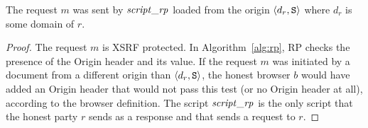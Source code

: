   
  \begin{lemma}\label{lemma:request-m-is-from-script-rp}
    The request $m$ was sent by $\mathit{script\_rp}$ loaded from 
    the origin $\langle d_r, \mathtt{S}\rangle$ where $d_r$ is some domain of 
    $r$.
  \end{lemma}
  
  \begin{proof}
    The request $m$ is XSRF protected. In Algorithm~\ref{alg:rp}, 
    RP checks the presence of the Origin header and its value. 
    If the request $m$ was initiated by a document from a 
    different origin than $\langle d_r, \mathtt{S}\rangle$, the honest browser 
    $b$ would have added an Origin header that would not 
    pass this test (or no Origin header at all), according to 
    the browser definition. The script $\mathit{script\_rp}$ is the 
    only script that the honest party $r$ sends as a response 
    and that sends a request to $r$.
  \end{proof}
  
